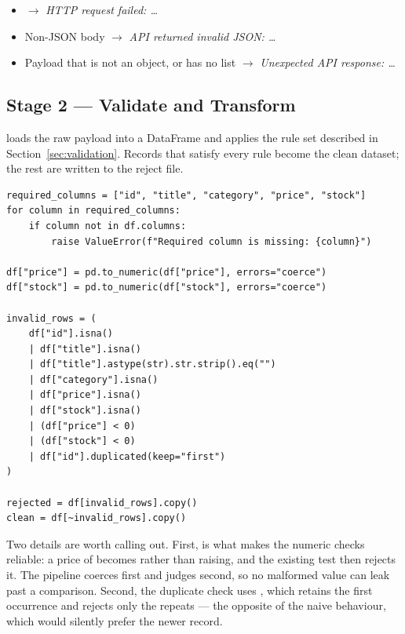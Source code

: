 \begin{warnbox}
\begin{itemize}
  \item {} $\rightarrow$ \emph{HTTP request failed: \ldots}
  \item Non-JSON body $\rightarrow$ \emph{API returned invalid JSON: \ldots}
  \item Payload that is not an object, or has no  list
        $\rightarrow$ \emph{Unexpected API response: \ldots}
\end{itemize}
\end{warnbox}

\subsection{Stage 2 --- Validate and Transform}

 loads the raw payload into a
 DataFrame and applies the rule set described in
Section~\ref{sec:validation}. Records that satisfy every rule become the
clean dataset; the rest are written to the reject file.

\begin{codebox}
\noindent
\begin{lstlisting}[style=py]
required_columns = ["id", "title", "category", "price", "stock"]
for column in required_columns:
    if column not in df.columns:
        raise ValueError(f"Required column is missing: {column}")

df["price"] = pd.to_numeric(df["price"], errors="coerce")
df["stock"] = pd.to_numeric(df["stock"], errors="coerce")

invalid_rows = (
    df["id"].isna()
    | df["title"].isna()
    | df["title"].astype(str).str.strip().eq("")
    | df["category"].isna()
    | df["price"].isna()
    | df["stock"].isna()
    | (df["price"] < 0)
    | (df["stock"] < 0)
    | df["id"].duplicated(keep="first")
)

rejected = df[invalid_rows].copy()
clean = df[~invalid_rows].copy()
\end{lstlisting}
\end{codebox}

Two details are worth calling out. First,  is what
makes the numeric checks reliable: a price of  becomes
 rather than raising, and the existing  test then
rejects it. The pipeline coerces first and judges second, so no malformed
value can leak past a comparison. Second, the duplicate check uses
, which retains the first occurrence and
rejects only the repeats --- the opposite of the naive
 behaviour, which would silently prefer the newer record.

